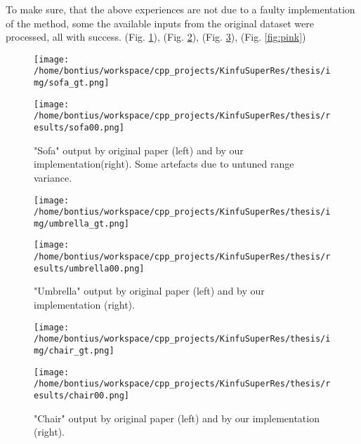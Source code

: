 \documentclass{ucl_thesis}
\newcommand{\figref}[1]{(Fig. \ref{#1})}
\begin{document}
To make sure, that the above experiences are not due to a faulty implementation of the method, some the available inputs from the original dataset were processed, all with success. \figref{fig:sofa}, \figref{fig:umbrella}, \figref{fig:chair}, \figref{fig:pink}

\begin{figure}[h!]\centering
	\begin{minipage}[b]{0.49\linewidth}\centering
		\texttt{[image: /home/bontius/workspace/cpp\_projects/KinfuSuperRes/thesis/img/sofa\_gt.png]}
	\end{minipage}
	\begin{minipage}[b]{0.49\linewidth}\centering
		\texttt{[image: /home/bontius/workspace/cpp\_projects/KinfuSuperRes/thesis/results/sofa00.png]}
	\end{minipage}
	\caption{"Sofa" output by original paper (left) and by our implementation(right). Some artefacts due to untuned range variance.}
	\label{fig:sofa}
\end{figure}

\begin{figure}[h!]\centering
	\begin{minipage}[b]{0.49\linewidth}\centering
		\texttt{[image: /home/bontius/workspace/cpp\_projects/KinfuSuperRes/thesis/img/umbrella\_gt.png]}
	\end{minipage}
	\begin{minipage}[b]{0.49\linewidth}\centering
		\texttt{[image: /home/bontius/workspace/cpp\_projects/KinfuSuperRes/thesis/results/umbrella00.png]}
	\end{minipage}
	\caption{"Umbrella" output by original paper (left) and by our implementation (right).}
	\label{fig:umbrella}
\end{figure}

\begin{figure}[h!]\centering
	\begin{minipage}[b]{0.49\linewidth}\centering
		\texttt{[image: /home/bontius/workspace/cpp\_projects/KinfuSuperRes/thesis/img/chair\_gt.png]}
	\end{minipage}
	\begin{minipage}[b]{0.49\linewidth}\centering
		\texttt{[image: /home/bontius/workspace/cpp\_projects/KinfuSuperRes/thesis/results/chair00.png]}
	\end{minipage}
	\caption{"Chair" output by original paper (left) and by our implementation (right).}
	\label{fig:chair}
\end{figure}
\end{document}
